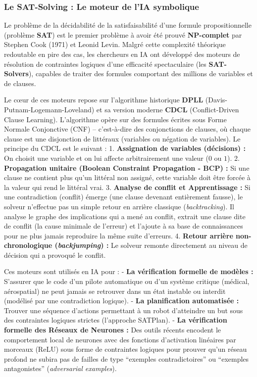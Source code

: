 \documentclass[11pt,a4paper]{article}
\begin{document}
\hypertarget{le-sat-solving-le-moteur-de-lia-symbolique}{%
\subsubsection{Le SAT-Solving : Le moteur de l'IA
symbolique}\label{le-sat-solving-le-moteur-de-lia-symbolique}}

Le problème de la décidabilité de la satisfaisabilité d'une formule
propositionnelle (problème \textbf{SAT}) est le premier problème à avoir
été prouvé \textbf{NP-complet} par Stephen Cook (1971) et Leonid Levin.
Malgré cette complexité théorique redoutable en pire des cas, les
chercheurs en IA ont développé des moteurs de résolution de contraintes
logiques d'une efficacité spectaculaire (les \textbf{SAT-Solvers}),
capables de traiter des formules comportant des millions de variables et
de clauses.

Le cœur de ces moteurs repose sur l'algorithme historique \textbf{DPLL}
(Davis-Putnam-Logemann-Loveland) et sa version moderne \textbf{CDCL}
(Conflict-Driven Clause Learning). L'algorithme opère sur des formules
écrites sous Forme Normale Conjonctive (CNF) -- c'est-à-dire des
conjonctions de clauses, où chaque clause est une disjonction de
littéraux (variables ou négation de variables). Le principe du CDCL est
le suivant : 1. \textbf{Assignation de variables (décisions) :} On
choisit une variable et on lui affecte arbitrairement une valeur (\(0\)
ou \(1\)). 2. \textbf{Propagation unitaire (Boolean Constraint
Propagation - BCP) :} Si une clause ne contient plus qu'un littéral non
assigné, cette variable doit être forcée à la valeur qui rend le
littéral vrai. 3. \textbf{Analyse de conflit et Apprentissage :} Si une
contradiction (conflit) émerge (une clause devenant entièrement fausse),
le solveur n'effectue pas un simple retour en arrière classique
(\emph{backtracking}). Il analyse le graphe des implications qui a mené
au conflit, extrait une clause dite de conflit (la cause minimale de
l'erreur) et l'ajoute à sa base de connaissances pour ne plus jamais
reproduire la même suite d'erreurs. 4. \textbf{Retour arrière
non-chronologique (\emph{backjumping}) :} Le solveur remonte directement
au niveau de décision qui a provoqué le conflit.

Ces moteurs sont utilisés en IA pour : - \textbf{La vérification
formelle de modèles :} S'assurer que le code d'un pilote automatique ou
d'un système critique (médical, aérospatial) ne peut jamais se retrouver
dans un état instable ou interdit (modélisé par une contradiction
logique). - \textbf{La planification automatisée :} Trouver une séquence
d'actions permettant à un robot d'atteindre un but sous des contraintes
logiques strictes (l'approche SATPlan). - \textbf{La vérification
formelle des Réseaux de Neurones :} Des outils récents encodent le
comportement local de neurones avec des fonctions d'activation linéaires
par morceaux (ReLU) sous forme de contraintes logiques pour prouver
qu'un réseau profond ne subira pas de failles de type ``exemples
contradictoires'' ou ``exemples antagonistes'' (\emph{adversarial
examples}).
\end{document}
